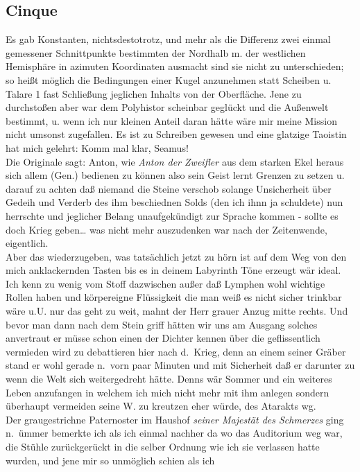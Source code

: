 \documentclass[
]{article}
\author{}
\date{\vspace{-2.5em}}
\begin{document}
\subsection{Cinque}\label{cinque}

Es gab Konstanten, nichtsdestotrotz, und mehr als die Differenz zwei
einmal gemessener Schnittpunkte bestimmten der Nordhalb m. der
westlichen Hemisphäre in azimuten Koordinaten ausmacht sind sie nicht zu
unterschieden; so heißt möglich die Bedingungen einer Kugel anzunehmen
statt Scheiben u. Talare 1 fast Schließung jeglichen Inhalts von der
Oberfläche. Jene zu durchstoßen aber war dem Polyhistor scheinbar
geglückt und die Außenwelt bestimmt, u. wenn ich nur kleinen Anteil
daran hätte wäre mir meine Mission nicht umsonst zugefallen. Es ist zu
Schreiben gewesen und eine glatzige Taoistin hat mich gelehrt: Komm mal
klar, Seamus!\\
Die Originale sagt: Anton, wie \emph{Anton der Zweifler} aus dem starken
Ekel heraus sich allem (Gen.) bedienen zu können also sein Geist lernt
Grenzen zu setzen u. darauf zu achten daß niemand die Steine verschob
solange Unsicherheit über Gedeih und Verderb des ihm beschiednen Solds
(den ich ihnn ja schuldete) nun herrschte und jeglicher Belang
unaufgekündigt zur Sprache kommen - sollte es doch Krieg geben\ldots{}
was nicht mehr auszudenken war nach der Zeitenwende, eigentlich.\\
Aber das wiederzugeben, was tatsächlich jetzt zu hörn ist auf dem Weg
von den mich anklackernden Tasten bis es in deinem Labyrinth Töne
erzeugt wär ideal. Ich kenn zu wenig vom Stoff dazwischen außer daß
Lymphen wohl wichtige Rollen haben und körpereigne Flüssigkeit die man
weiß es nicht sicher trinkbar wäre u.U. nur das geht zu weit, mahnt der
Herr grauer Anzug mitte rechts. Und bevor man dann nach dem Stein griff
hätten wir uns am Ausgang solches anvertraut er müsse schon einen der
Dichter kennen über die geflissentlich vermieden wird zu debattieren
hier nach d.~Krieg, denn an einem seiner Gräber stand er wohl gerade
n.~vorn paar Minuten und mit Sicherheit daß er darunter zu wenn die Welt
sich weitergedreht hätte. Denns wär Sommer und ein weiteres Leben
anzufangen in welchem ich mich nicht mehr mit ihm anlegen sondern
überhaupt vermeiden seine W. zu kreutzen eher würde, des Atarakts wg.\\
Der graugestrichne Paternoster im Haushof \emph{seiner Majestät des
Schmerzes} ging n.~ümmer bemerkte ich als ich einmal nachher da wo das
Auditorium weg war, die Stühle zurückgerückt in die selber Ordnung wie
ich sie verlassen hatte wurden, und jene mir so unmöglich schien als ich
\end{document}
